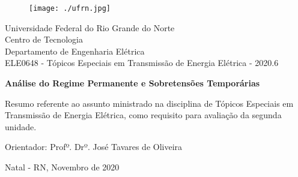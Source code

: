 \begin{titlepage}
	\begin{center}
	
	\begin{figure}[!ht]
	\centering
	\texttt{[image: ./ufrn.jpg]}
	\end{figure}

		Universidade Federal do Rio Grande do Norte \\ Centro de Tecnologia \\ Departamento de Engenharia Elétrica \\  ELE0648 - Tópicos Especiais em Transmissão de Energia Elétrica  - 2020.6 \\
\vspace{15pt}
        
        \vspace{85pt}
        
		\textbf{\Large{Análise do Regime Permanente e Sobretensões Temporárias}}\\
			
	\end{center}
\vspace{1,5cm}
	
	\begin{flushright}

   \begin{list}{}{
      \setlength{\leftmargin}{4.5cm}
      \setlength{\rightmargin}{0cm}
      \setlength{\labelwidth}{0pt}
      \setlength{\labelsep}{\leftmargin}}

      \item Resumo referente ao assunto ministrado na disciplina de Tópicos Especiais em Transmissão de Energia Elétrica, como requisito para avaliação da segunda unidade.

      \begin{list}{}{
      \setlength{\leftmargin}{0cm}
      \setlength{\rightmargin}{0cm}
      \setlength{\labelwidth}{0pt}
      \setlength{\labelsep}{\leftmargin}}


            \item Orientador: Profº. Drº. José Tavares de Oliveira

      \end{list}
   \end{list}
\end{flushright}
\vspace{1cm}
\begin{center}
		\vspace{\fill}
		 Natal - RN, Novembro de 2020
			\end{center}
\end{titlepage}
\newpage